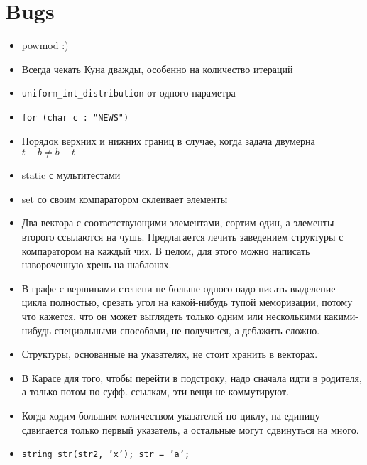 \section{Bugs}

\begin{itemize}
    \item powmod :)

    \item Всегда чекать Куна дважды, особенно на количество итераций
    
    \item \texttt{uniform\_int\_distribution} от одного параметра
    
    \item \texttt{for (char c : "NEWS")}
    
    \item Порядок верхних и нижних границ в случае, когда задача двумерна
    $t - b \neq b - t$
    
    \item static с мультитестами

    \item set со своим компаратором склеивает элементы

    \item Два вектора с соответствующими элементами, сортим один, а элементы
    второго ссылаются на чушь. Предлагается лечить заведением структуры с
    компаратором на каждый чих. В целом, для этого можно написать навороченную
    хрень на шаблонах.

    \item В графе с вершинами степени не больше одного надо писать выделение
    цикла полностью, срезать угол на какой-нибудь тупой меморизации, потому
    что кажется, что он может выглядеть только одним или несколькими
    какими-нибудь специальными способами, не получится, а дебажить сложно.

    \item Структуры, основанные на указателях, не стоит хранить в векторах.

    \item В Карасе для того, чтобы перейти в подстроку, надо сначала идти в
    родителя, а только потом по суфф. ссылкам, эти вещи не коммутируют.

    \item Когда ходим большим количеством указателей по циклу, на единицу
    сдвигается только первый указатель, а остальные могут сдвинуться на много.

    \item \texttt{string str(str2, 'x'); str = 'a';}
\end{itemize}

